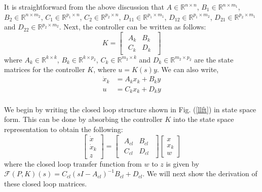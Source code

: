 \documentclass[a4paper,12pt]{article}
\begin{document}
		It is straightforward from the above discussion that $A \in \mathbb{R}^{n \times n}$, $B_{1} \in \mathbb{R}^{n \times m_{1}}$, $B_{2} \in \mathbb{R}^{n \times m_{2}}$, $C_{1} \in \mathbb{R}^{p_{1} \times n}$, $C_{2} \in \mathbb{R}^{p_{2} \times n}$, $D_{11} \in \mathbb{R}^{p_{1} \times m_{1}}$, $D_{12} \in \mathbb{R}^{p_{1} \times m_{2}}$, $D_{21} \in \mathbb{R}^{p_{2} \times m_{1}}$ and $D_{22} \in \mathbb{R}^{p_{2} \times m_{2}}$. Next, the controller can be written as follows:
		\[
		K=\begin{bmatrix}
		\begin{array}{c|c}
		A_{k} & B_{k} \\ \hline
		C_{k} & D_{k}
		\end{array}
		\end{bmatrix}
		\]
		where $A_{k} \in \mathbb{R}^{k \times k}$, $B_{k} \in \mathbb{R}^{k \times p_{2}}$, $C_{k} \in \mathbb{R}^{m_{2} \times k}$ and $D_{k} \in \mathbb{R}^{m_{2} \times p_{2}}$ are the state matrices for the controller $K$, where $u=K(s)y$. We can also write,
		\begin{align}
		\dot{x}_{k} &= A_{k}x_{k} + B_{k}y\\
		u&=C_{k}x_{k}+D_{k}y
		\label{ss2}
		\end{align}
		\\
		We begin by writing the closed loop structure shown in Fig. (\ref{llft}) in state space form. This can be done by absorbing the controller $K$ into the state space representation to obtain the following:
		\begin{equation}
		\begin{bmatrix}
		\dot{x} \\
		\dot{x}_{k} \\ \hline
		z
		\end{bmatrix}
		=
		\begin{bmatrix}
	\begin{array}{c|c}
	A_{cl} & B_{cl}\\ \hline
	C_{cl}
	 & D_{cl}
	\end{array}
	\end{bmatrix}
	\begin{bmatrix}
	x \\ x_{k} \\ \hline
	w
	\end{bmatrix}
	\label{cl}
		\end{equation}
		where the closed loop transfer function from $w$ to $z$ is given by \\ $\mathscr{F}(P,K)(s) = C_{cl}(sI-A_{cl})^{-1}B_{cl} + D_{cl}$. We will next show the derivation of these closed loop matrices.
\end{document}
